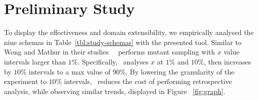 \section{Preliminary Study}


To display the effectiveness and domain extensibility, we empirically analysed the nine schemas in Table~\ref{tbl:study-schemas}
with the presented tool.
Similar to Wong and Mathur in their studies~\cite{mathur1994empirical, wong1993mutation} \mr~performs mutant sampling with $x$ value intervals
larger than $1\%$.  Specifically, \mr~analyses $x$ at $1\%$ and  $10\%$, then increases by $10\%$ intervals to a max value of $90\%$.
By lowering the granularity of the experiment to $10\%$ intervals, \mr~reduces the cost of performing retrospective analysis, while observing
similar trends, displayed in Figure ~\ref{fig:graph}.








